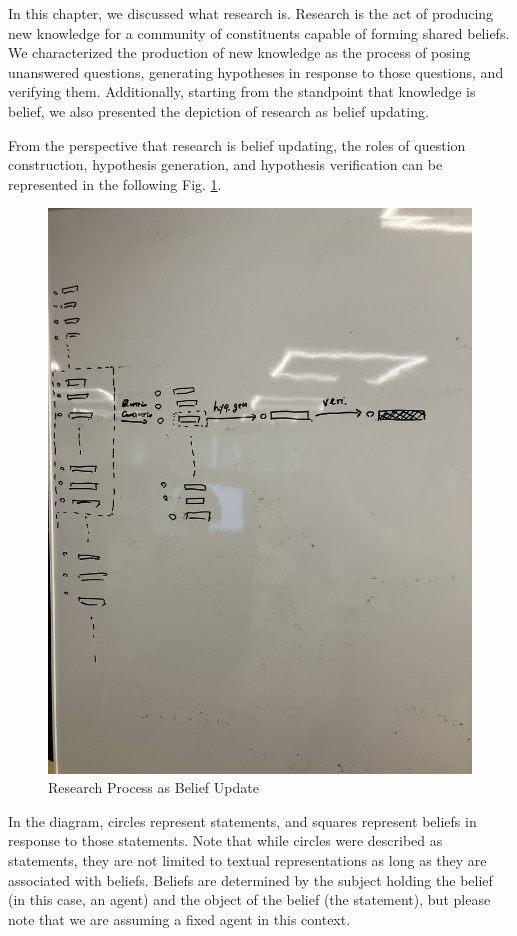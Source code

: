 \documentclass{book}
\begin{document}
In this chapter, we discussed what research is. Research is the act of producing new knowledge for a community of constituents capable of forming shared beliefs. We characterized the production of new knowledge as the process of posing unanswered questions, generating hypotheses in response to those questions, and verifying them. Additionally, starting from the standpoint that knowledge is belief, we also presented the depiction of research as belief updating.

From the perspective that research is belief updating, the roles of question construction, hypothesis generation, and hypothesis verification can be represented in the following Fig. \ref{fig:beliefupdate}. 
\begin{figure}[htb]
    \centering
    \includegraphics[width=\textwidth]{figs/beliefupdate.jpg}
    \caption{Research Process as Belief Update}
    \label{fig:beliefupdate}
\end{figure}
In the diagram, circles represent statements, and squares represent beliefs in response to those statements. Note that while circles were described as statements, they are not limited to textual representations as long as they are associated with beliefs. Beliefs are determined by the subject holding the belief (in this case, an agent) and the object of the belief (the statement), but please note that we are assuming a fixed agent in this context.
\end{document}
